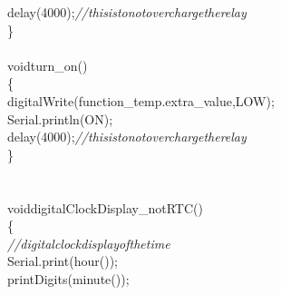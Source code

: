 \documentclass[a4paper, 12pt]{article}
\newcommand\SPC{\hspace*{0.6em}}
\newcommand\QOT{\mbox{\char 34}}
\newcommand{\CppAComment}[1]{\textit{\textcolor[rgb]{0.2,0.4,1}{#1}}}
\newcommand{\CppAIdentifier}[1]{\textcolor[rgb]{0,1,0}{#1}}
\newcommand{\CppANumber}[1]{\textcolor[rgb]{0,0,1}{#1}}
\newcommand{\CppAReservedWord}[1]{\textcolor[rgb]{0,0.5,0}{#1}}
\newcommand{\CppASpace}[1]{\textcolor[rgb]{1,1,1}{\colorbox[rgb]{0,0,0}{#1}}}
\newcommand{\CppAString}[1]{\textcolor[rgb]{0.76,0.76,0.76}{#1}}
\newcommand{\CppASymbol}[1]{\textcolor[rgb]{1,0,0}{#1}}
\begin{document}
\begin{ttfamily}
\CppASpace{\SPC \SPC \SPC \SPC \SPC \SPC }\CppAIdentifier{delay}\CppASpace{\SPC }\CppASymbol{(}\CppANumber{4000}\CppASymbol{)}\CppASymbol{;}\CppASpace{\SPC \SPC \SPC \SPC \SPC \SPC \SPC \SPC \SPC \SPC \SPC \SPC \SPC \SPC \SPC \SPC \SPC \SPC \SPC \SPC \SPC \SPC \SPC \SPC \SPC \SPC \SPC \SPC \SPC \SPC \SPC \SPC \SPC \SPC \SPC \SPC \SPC }\CppAComment{//this\SPC is\SPC to\SPC not\SPC overcharge\SPC the\SPC relay}\\
\CppASpace{\SPC \SPC }\CppASymbol{\}}\\
\\
\CppAReservedWord{void}\CppASpace{\SPC }\CppAIdentifier{turn\_on}\CppASymbol{(}\CppASymbol{)}\\
\CppASymbol{\{}\\
\CppASpace{\SPC \SPC \SPC \SPC \SPC \SPC }\CppAIdentifier{digitalWrite}\CppASymbol{(}\CppAIdentifier{function\_temp}\CppASymbol{.}\CppAIdentifier{extra\_value}\CppASpace{\SPC }\CppASymbol{,}\CppASpace{\SPC }\CppAIdentifier{LOW}\CppASymbol{)}\CppASymbol{;}\\
\CppASpace{\SPC \SPC \SPC \SPC \SPC \SPC }\CppAIdentifier{Serial}\CppASymbol{.}\CppAIdentifier{println}\CppASymbol{(}\CppAString{\QOT ON\QOT }\CppASymbol{)}\CppASymbol{;}\\
\CppASpace{\SPC \SPC \SPC \SPC \SPC \SPC }\CppAIdentifier{delay}\CppASpace{\SPC }\CppASymbol{(}\CppANumber{4000}\CppASymbol{)}\CppASymbol{;}\CppASpace{\SPC \SPC \SPC \SPC \SPC \SPC \SPC \SPC \SPC \SPC \SPC \SPC \SPC \SPC \SPC \SPC \SPC \SPC \SPC \SPC \SPC \SPC \SPC \SPC \SPC \SPC \SPC \SPC \SPC \SPC \SPC \SPC \SPC \SPC \SPC \SPC \SPC \SPC }\CppAComment{//this\SPC is\SPC to\SPC not\SPC overcharge\SPC the\SPC relay}\\
\CppASpace{\SPC \SPC }\CppASymbol{\}}\\
\\
\\
\CppAReservedWord{void}\CppASpace{\SPC }\CppAIdentifier{digitalClockDisplay\_notRTC}\CppASymbol{(}\CppASymbol{)}\\
\CppASymbol{\{}\\
\CppASpace{\SPC \SPC }\CppAComment{//\SPC digital\SPC clock\SPC display\SPC of\SPC the\SPC time}\\
\CppASpace{\SPC \SPC }\CppAIdentifier{Serial}\CppASymbol{.}\CppAIdentifier{print}\CppASymbol{(}\CppAIdentifier{hour}\CppASymbol{(}\CppASymbol{)}\CppASymbol{)}\CppASymbol{;}\\
\CppASpace{\SPC \SPC }\CppAIdentifier{printDigits}\CppASymbol{(}\CppAIdentifier{minute}\CppASymbol{(}\CppASymbol{)}\CppASymbol{)}\CppASymbol{;}\\

\end{ttfamily}
\end{document}
